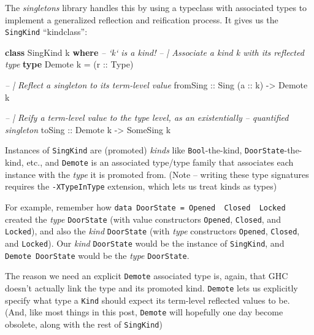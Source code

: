 \documentclass[]{article}
\newenvironment{Shaded}{}{}
\newcommand{\CommentTok}[1]{\textcolor[rgb]{0.38,0.63,0.69}{\textit{#1}}}
\newcommand{\DataTypeTok}[1]{\textcolor[rgb]{0.56,0.13,0.00}{#1}}
\newcommand{\FunctionTok}[1]{\textcolor[rgb]{0.02,0.16,0.49}{#1}}
\newcommand{\KeywordTok}[1]{\textcolor[rgb]{0.00,0.44,0.13}{\textbf{#1}}}
\newcommand{\NormalTok}[1]{#1}
\newcommand{\OtherTok}[1]{\textcolor[rgb]{0.00,0.44,0.13}{#1}}
\begin{document}
The \emph{singletons} library handles this by using a typeclass with associated
types to implement a generalized reflection and reification process. It gives us
the \texttt{SingKind} ``kindclass'':

\begin{Shaded}
\begin{Highlighting}[]
\KeywordTok{class} \DataTypeTok{SingKind}\NormalTok{ k }\KeywordTok{where}      \CommentTok{-- `k` is a kind!}
    \CommentTok{-- | Associate a kind k with its reflected type}
    \KeywordTok{type} \DataTypeTok{Demote}\NormalTok{ k }\FunctionTok{=}\NormalTok{ (}\OtherTok{r ::} \DataTypeTok{Type}\NormalTok{)}

    \CommentTok{-- | Reflect a singleton to its term-level value}
\OtherTok{    fromSing ::} \DataTypeTok{Sing}\NormalTok{ (}\OtherTok{a ::}\NormalTok{ k) }\OtherTok{->} \DataTypeTok{Demote}\NormalTok{ k}

    \CommentTok{-- | Reify a term-level value to the type level, as an existentially}
    \CommentTok{-- quantified singleton}
\OtherTok{    toSing ::} \DataTypeTok{Demote}\NormalTok{ k }\OtherTok{->} \DataTypeTok{SomeSing}\NormalTok{ k}
\end{Highlighting}
\end{Shaded}

Instances of \texttt{SingKind} are (promoted) \emph{kinds} like
\texttt{Bool}-the-kind, \texttt{DoorState}-the-kind, etc., and \texttt{Demote}
is an associated type/type family that associates each instance with the
\emph{type} it is promoted from. (Note -- writing these type signatures requires
the \texttt{-XTypeInType} extension, which lets us treat kinds as types)

For example, remember how
\texttt{data\ DoorState\ =\ Opened\ \textbar{}\ Closed\ \textbar{}\ Locked}
created the \emph{type} \texttt{DoorState} (with value constructors
\texttt{Opened}, \texttt{Closed}, and \texttt{Locked}), and also the \emph{kind}
\texttt{DoorState} (with \emph{type} constructors
\texttt{\textquotesingle{}Opened}, \texttt{\textquotesingle{}Closed}, and
\texttt{\textquotesingle{}Locked}). Our \emph{kind} \texttt{DoorState} would be
the instance of \texttt{SingKind}, and \texttt{Demote\ DoorState} would be the
\emph{type} \texttt{DoorState}.

The reason we need an explicit \texttt{Demote} associated type is, again, that
GHC doesn't actually link the type and its promoted kind. \texttt{Demote} lets
us explicitly specify what type a \texttt{Kind} should expect its term-level
reflected values to be. (And, like most things in this post, \texttt{Demote}
will hopefully one day become obsolete, along with the rest of
\texttt{SingKind})
\end{document}
